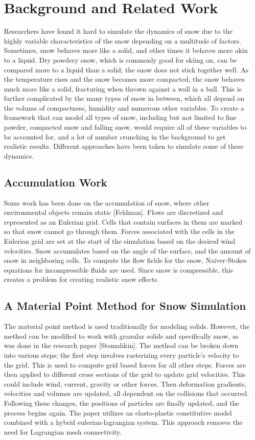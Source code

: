 \documentclass{acm_proc_article-sp}
\begin{document}
\section{Background and Related Work}
Researchers have found it hard to simulate the dynamics of snow due to the highly variable characteristics of the snow depending on a multitude of factors. Sometimes, snow behaves more like a solid, and other times it behaves more akin to a liquid. Dry powdery snow, which is commonly good for skiing on, can be compared more to a liquid than a solid; the snow does not stick together well. As the temperature rises and the snow becomes more compacted, the snow behaves much more like a solid, fracturing when thrown against a wall in a ball.  This is further complicated by the many types of snow in between, which all depend on the volume of compactness, humidity and numerous other variables. To create a framework that can model all types of snow, including but not limited to fine powder, compacted snow and falling snow, would require all of these variables to be accounted for, and a lot of number crunching in the background to get realistic results. Different approaches have been taken to simulate some of these dynamics.

\subsection{Accumulation Work}
Some work has been done on the accumulation of snow, where other environmental objects remain static [Feldman]. Flows are discretized and represented as an Eulerian grid. Cells that contain surfaces in them are marked so that snow cannot go through them. Forces associated with the cells in the Eulerian grid are set at the start of the simulation based on the desired wind velocities. Snow accumulates based on the angle of the surface, and the amount of snow in neighboring cells. To compute the flow fields for the snow, Naiver-Stokes equations for incompressible fluids are used. Since snow is compressible, this creates a problem for creating realistic snow effects.

\subsection{A Material Point Method for Snow Simulation}
The material point method is used traditionally for modeling solids. However, the method can be modified to work with granular solids and specifically snow, as was done in the research paper [Stomahkin]. The method can be broken down into various steps; the first step involves rasterizing every particle’s velocity to the grid. This is used to compute grid based forces for all other steps.  Forces are then applied to different cross sections of the grid to update grid velocities. This could include wind, current, gravity or other forces. Then deformation gradients, velocities and volumes are updated, all dependent on the collisions that occurred. Following these changes, the positions of particles are finally updated, and the process begins again. The paper utilizes an elasto-plastic constitutive model combined with a hybrid eulerian-lagrangian system. This approach removes the need for Lagrangian mesh connectivity.
\end{document}
